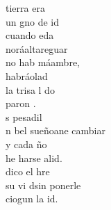 \begin{cancion}%
	 tierra era\\
	 un gno de id\\
	cuando eda\\
	noráaltareguar\\
	no hab máambre,\\
	habráolad\\
	la trisa l do\\
	paron .\\
	s pesadil\\
	n bel sueñoane cambiar\\
	y cada ño\\
	he harse alid.\\
	 dico el hre \\
	 su vi dsin ponerle\\
	ciogun la id.\\
\end{cancion}%
